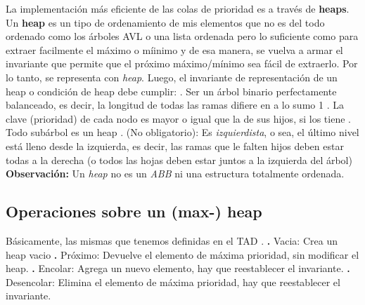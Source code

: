 \documentclass[10pt,a4paper]{article}
\begin{document}
La implementación más eficiente de las colas de prioridad es a través de \textbf{heaps}.
\newline
\newline
Un \textbf{heap} es un tipo de ordenamiento de mis elementos que no es del todo ordenado como los árboles AVL o una lista ordenada pero lo suficiente como para extraer facilmente el máximo o míinimo y de esa manera, se vuelva a armar el invariante que permite que el próximo máximo/mínimo sea fácil de extraerlo.  
\newline
\newline
Por lo tanto,  se representa con \textit{heap}.
\newline
\newline
Luego, el invariante de representación de un heap o condición de heap debe cumplir:
\newline
{}. Ser un árbol binario perfectamente balanceado, es decir, la longitud de todas las ramas difiere en a lo sumo 1
\newline
{}. La clave (prioridad) de cada nodo es mayor o igual que la de sus hijos, si los tiene
\newline
{}. Todo subárbol es un heap
\newline
{}. (No obligatorio): Es \textit{izquierdista}, o sea, el último nivel está lleno desde la izquierda, es decir, las ramas que le falten hijos deben estar todas a la derecha (o todos las hojas deben estar juntos a la izquierda del árbol)
\newline
\newline
\textbf{Observación:} Un \textit{heap} no es un \textit{ABB} ni una estructura totalmente ordenada.
\subsection{Operaciones sobre un (max-) heap}

Básicamente, las mismas que tenemos definidas en el TAD .
\newline
\newline
\textbf{.} Vacia: Crea un heap vacio
\newline
\newline
\textbf{.} Próximo: Devuelve el elemento de máxima prioridad, sin modificar el heap.
\newline
\newline
\textbf{.} Encolar: Agrega un nuevo elemento, hay que reestablecer el invariante.
\newline
\newline
\textbf{.} Desencolar: Elimina el elemento de máxima prioridad, hay que reestablecer el invariante.
\newpage
\end{document}

